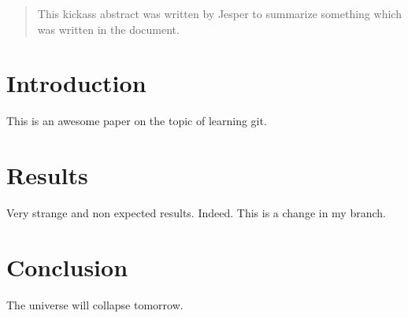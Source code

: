 \documentclass{article}
\begin{document}
\begin{abstract}
This kickass abstract was written by Jesper to summarize something which was written in the document.
\end{abstract}

\section{Introduction}

This is an awesome paper on the topic of learning git.

\section{Results}

Very strange and non expected results.  
Indeed.
This is a change in my branch.

\section{Conclusion}

The universe will collapse tomorrow.
\end{document}
